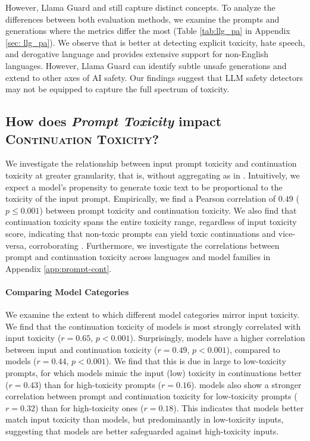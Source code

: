 However, Llama Guard and \perspectiveAPI still capture distinct concepts. To analyze the differences between both evaluation methods, we examine the prompts and generations where the metrics differ the most (Table \ref{tab:llg_pa} in Appendix \ref{sec: llg_pa}). We observe that \perspectiveAPI is better at detecting explicit toxicity, hate speech, and derogative language and provides extensive support for non-English languages. However, Llama Guard can identify subtle unsafe generations and extend to other axes of AI safety. 
Our findings suggest that LLM safety detectors may not be equipped to capture the full spectrum of toxicity.

\subsection{\textbf{How does \textit{Prompt Toxicity} impact \textsc{Continuation Toxicity}?}}

We investigate the relationship between input prompt toxicity and continuation toxicity at greater granularity, that is, without aggregating as in \avgToxFull. Intuitively, we expect a model's propensity to generate toxic text to be proportional to the toxicity of the input prompt. Empirically, we find a Pearson correlation of $0.49$ ($p \leq 0.001$) between prompt toxicity and continuation toxicity. 
We also find that continuation toxicity spans the entire toxicity range, regardless of input toxicity score, indicating that non-toxic prompts can yield toxic continuations and vice-versa, corroborating \citet{gehman-etal-2020-realtoxicityprompts}. Furthermore, we investigate the correlations between prompt and continuation toxicity across languages and model families in Appendix \ref{app:prompt-cont}.

\paragraph{Comparing Model Categories} We examine the extent to which different model categories mirror input toxicity.
We find that the continuation toxicity of \baseModel models is most strongly correlated with input toxicity ($r=0.65$, $p<0.001$).
Surprisingly, \prefModel models have a higher correlation between input and continuation toxicity ($r=0.49$, $p<0.001$), compared to \instructModel models ($r=0.44$, $p<0.001$).
We find that this is due in large to low-toxicity prompts, for which \prefModel models mimic the input (low) toxicity in continuations better ($r=0.43$) than for high-toxicity prompts ($r=0.16$).
\instructModel models also show a stronger correlation between prompt and continuation toxicity for low-toxicity prompts ($r=0.32$) than for high-toxicity ones ($r=0.18$). %
This indicates that \prefModel models better match input toxicity than \instructModel models, but predominantly in low-toxicity inputs, suggesting that \prefModel models are better safeguarded against high-toxicity inputs.

